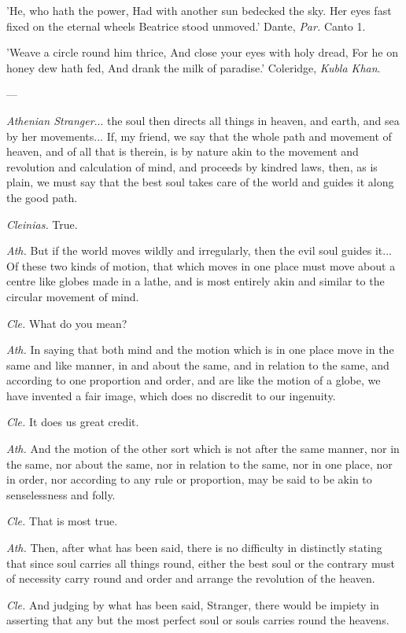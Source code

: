 \documentclass[a4paper, 11pt, oneside, polutonikogreek, english]{article}
\begin{document}
'He, who hath the power,   
Had with another sun bedecked the sky.  
Her eyes fast fixed on the eternal wheels  
Beatrice stood unmoved.'  
Dante, \emph{Par.} Canto 1.

'Weave a circle round him thrice,  
And close your eyes with holy dread,  
For he on honey dew hath fed,  
And drank the milk of paradise.'  
Coleridge, \emph{Kubla Khan}.

---

\emph{Athenian Stranger}... the soul then directs all things in heaven, and earth, and sea by her movements... If, my friend, we say that the whole path and movement of heaven, and of all that is therein, is by nature akin to the movement and revolution and calculation of mind, and proceeds by kindred laws, then, as is plain, we must say that the best soul takes care of the world and guides it along the good path.

\emph{Cleinias.} True.

\emph{Ath.} But if the world moves wildly and irregularly, then the evil soul guides it... Of these two kinds of motion, that which moves in one place must move about a centre like globes made in a lathe, and is most entirely akin and similar to the circular movement of mind.

\emph{Cle.} What do you mean?

\emph{Ath.} In saying that both mind and the motion which is in one place move in the same and like manner, in and about the same, and in relation to the same, and according to one proportion and order, and are like the motion of a globe, we have invented a fair image, which does no discredit to our ingenuity.

\emph{Cle.} It does us great credit.

\emph{Ath.} And the motion of the other sort which is not after the same manner, nor in the same, nor about the same, nor in relation to the same, nor in one place, nor in order, nor according to any rule or proportion, may be said to be akin to senselessness and folly.

\emph{Cle.} That is most true.

\emph{Ath.} Then, after what has been said, there is no difficulty in distinctly stating that since soul carries all things round, either the best soul or the contrary must of necessity carry round and order and arrange the revolution of the heaven.

\emph{Cle.} And judging by what has been said, Stranger, there would be impiety in asserting that any but the most perfect soul or souls carries round the heavens.
\end{document}

